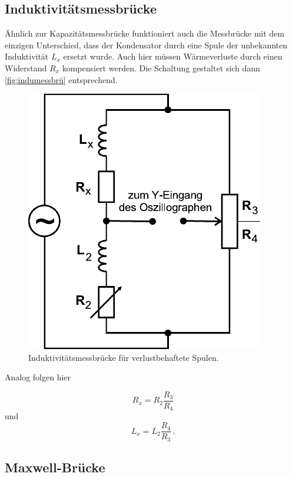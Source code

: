 \subsection{Induktivitätsmessbrücke}
\label{subsec:indumessbrü}

Ähnlich zur Kapazitätsmessbrücke funktioniert auch die Messbrücke mit dem einzigen Unterschied, dass der Kondensator durch eine Spule der unbekannten Induktivität $L_x$ ersetzt wurde.
Auch hier müssen Wärmeverluste durch einen Widerstand $R_x$ kompensiert werden. Die Schaltung gestaltet sich dann \autoref{fig:indumessbrü} entsprechend.

\begin{figure}[H]
    \centering
    \includegraphics{figures/Induktivitätsmessbrücke.pdf}
    \caption{Induktivitätsmessbrücke für verlustbehaftete Spulen\cite{ap07}.}
    \label{fig:indumessbrü}
\end{figure}

Analog folgen hier

\begin{equation*}
    R_x = R_2 \frac{R_3}{R_4}
    \label{eq:resxindubrü}
\end{equation*}
und
\begin{equation*}
    L_x = L_2 \frac{R_4}{R_3}\,.
    \label{eq:induxindubrü}
\end{equation*}


\subsection{Maxwell-Brücke}
\label{subsec:maxwellbrü}


